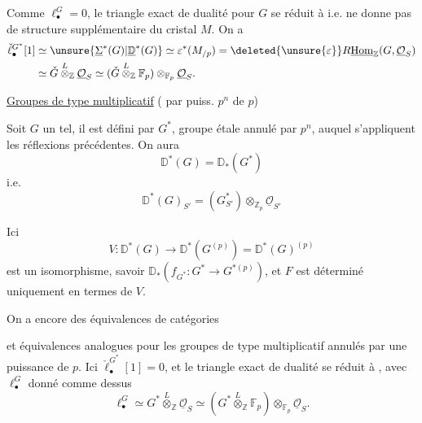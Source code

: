Comme $\ell_\bullet^G=0$, le triangle exact de dualité pour $G$
se réduit à
i.e. ne donne pas de structure supplémentaire
 
du cristal $M$. On a
\[
\begin{aligned}
\check\ell_\bullet^{G^*}[1]
&\simeq\unsure{\underline{\Sigma}^*(G)|\underline{\mathbb D}^*(G)}
\simeq\varepsilon^*(M_{/p})
=\deleted{\unsure{\varepsilon}}
R\underline{\operatorname{Hom}}_{\mathbb Z}(G,\underline{\mathcal O}_S)\\
&\simeq\check G\overset L\otimes_{\mathbb Z}\underline{\mathcal O}_S
\simeq(\check G\overset L\otimes_{\mathbb Z}\mathbb F_p)
\otimes_{\mathbb F_p}\underline{\mathcal O}_S.
\end{aligned}
\]

\uline{Groupes de type multiplicatif}
( par puiss. $p^n$ de $p$)

Soit $G$  un tel, il est défini par $G^*$,
groupe étale annulé par $p^n$, auquel s'appliquent les réflexions
précédentes. On aura
\[
\mathbb D^*(G)=\mathbb D_*(G^*)
\]
i.e.
\[
\mathbb D^*(G)_{S'}=(G^*_{S'})\otimes_{\mathbb Z_p}
\underline{\mathcal O}_{S'}
\]

Ici
\[
V:\mathbb D^*(G)\longrightarrow\mathbb D^*(G^{(p)})
=\mathbb D^*(G)^{(p)}
\]
est un isomorphisme, savoir
$\mathbb D_*(f_{G^*}:G^*\longrightarrow G^{*(p)})$,
et $F$ est  déterminé uniquement en termes de $V$.

On a encore des équivalences de catégories

et équivalences analogues pour les groupes
 de type multiplicatif annulés par une
puissance de $p$. 
Ici $\check\ell_\bullet^{G^*}[1]=0$, et le triangle exact de dualité
se réduit à
,
avec $\ell_\bullet^G$ donné comme dessus
\[
\ell_\bullet^G\simeq G^*\overset L\otimes_{\mathbb Z}
\underline{\mathcal O}_S
\simeq(G^*\overset L\otimes_{\mathbb Z}\mathbb F_p)
\otimes_{\mathbb F_p}\underline{\mathcal O}_S.
\]

